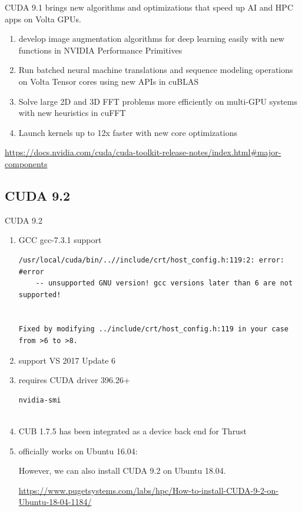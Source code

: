 CUDA 9.1 brings new algorithms and optimizations that speed up AI and HPC apps on Volta GPUs.
\begin{enumerate}
  
  \item   develop  image augmentation algorithms for deep learning easily with
  new functions in NVIDIA Performance Primitives
  
  
  \item Run batched neural machine translations and sequence modeling operations
  on Volta Tensor cores using new APIs in cuBLAS
  
  \item Solve large 2D and 3D FFT problems more efficiently on multi-GPU systems
  with new heuristics in cuFFT
  
  \item Launch kernels up to 12x faster with new core optimizations
\end{enumerate}
\url{https://docs.nvidia.com/cuda/cuda-toolkit-release-notes/index.html#major-components}

\subsection{CUDA 9.2}
\label{sec:CUDA_9.2}

CUDA 9.2
\begin{enumerate}
  \item GCC gcc-7.3.1 support
  
\begin{verbatim}
/usr/local/cuda/bin/..//include/crt/host_config.h:119:2: error: #error 
	-- unsupported GNU version! gcc versions later than 6 are not supported!
	
	
Fixed by modifying ../include/crt/host_config.h:119 in your case from >6 to >8.
\end{verbatim}

  
  \item support VS 2017 Update 6
  
  \item requires CUDA driver 396.26+
  
\begin{verbatim}
nvidia-smi


\end{verbatim}
  
  \item CUB 1.7.5 has been integrated as a device back end for Thrust
  
  \item officially works on Ubuntu 16.04:

  However, we can also install CUDA 9.2 on Ubuntu 18.04.
  
  \url{https://www.pugetsystems.com/labs/hpc/How-to-install-CUDA-9-2-on-Ubuntu-18-04-1184/}
\end{enumerate}

